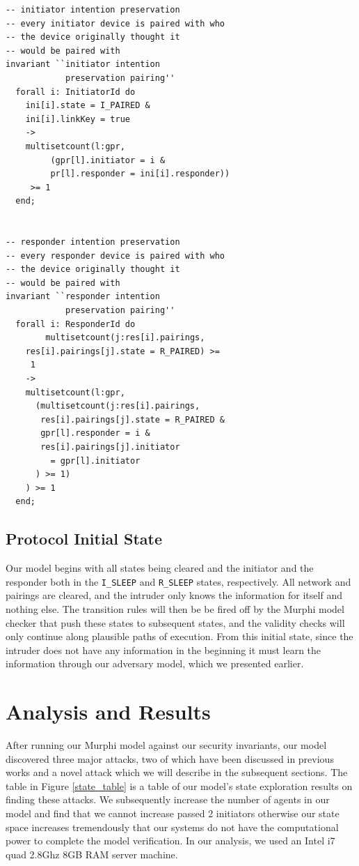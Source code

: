 \documentclass{acm_proc_article-sp}
\begin{document}
\begin{verbatim}
-- initiator intention preservation
-- every initiator device is paired with who 
-- the device originally thought it 
-- would be paired with
invariant ``initiator intention 
            preservation pairing''
  forall i: InitiatorId do
    ini[i].state = I_PAIRED &
    ini[i].linkKey = true
    ->
    multisetcount(l:gpr,
         (gpr[l].initiator = i &
         pr[l].responder = ini[i].responder))
     >= 1
  end;


-- responder intention preservation
-- every responder device is paired with who 
-- the device originally thought it 
-- would be paired with
invariant ``responder intention 
            preservation pairing''
  forall i: ResponderId do
        multisetcount(j:res[i].pairings,
    res[i].pairings[j].state = R_PAIRED) >=
     1
    ->
    multisetcount(l:gpr,
      (multisetcount(j:res[i].pairings,
       res[i].pairings[j].state = R_PAIRED &
       gpr[l].responder = i &
       res[i].pairings[j].initiator 
         = gpr[l].initiator
      ) >= 1)
    ) >= 1
  end;
\end{verbatim}

\subsection{Protocol Initial State}
Our model begins with all states being cleared and the initiator and the responder both in the \texttt{I\_SLEEP} and \texttt{R\_SLEEP} states, respectively. All network and pairings are cleared, and the intruder only knows the information for itself and nothing else. The transition rules will then be be fired off by the Murphi model checker that push these states to subsequent states, and the validity checks will only continue along plausible paths of execution. From this initial state, since the intruder does not have any information in the beginning it must learn the information through our adversary model, which we presented earlier.

\section{Analysis and Results}

After running our Murphi model against our security invariants, our model discovered three major attacks, two of which have been discussed in previous works \cite{phan:mingard} and a novel attack which we will describe in the subsequent sections. The table in Figure \ref{state_table} is a table of our model's state exploration results on finding these attacks. We subsequently increase the number of agents in our model and find that we cannot increase passed 2 initiators otherwise our state space increases tremendously that our systems do not have the computational power to complete the model verification. In our analysis, we used an Intel i7 quad 2.8Ghz 8GB RAM server machine.
\end{document}
